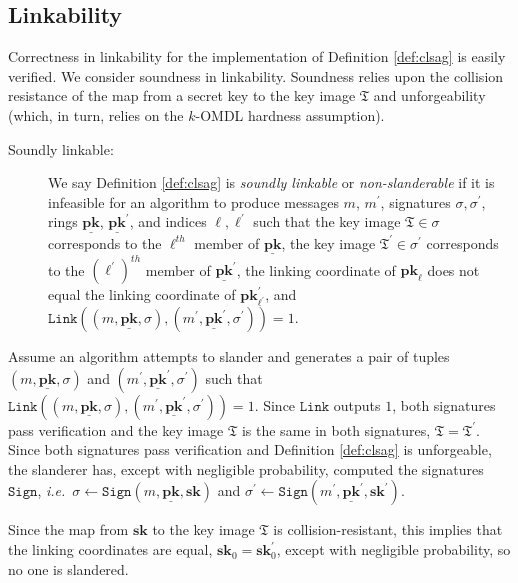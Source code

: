 \documentclass{mrl}
\theoremstyle{plain}
\theoremstyle{definition}
\begin{document}
\subsection{Linkability}
Correctness in linkability for the implementation of Definition \ref{def:clsag} is easily verified. We consider soundness in linkability. Soundness relies upon the collision resistance of the map from a secret key to the key image $\mathfrak{T}$ and unforgeability (which, in turn, relies on the $k$-OMDL hardness assumption).
\begin{description}
\item[Soundly linkable:]  We say Definition \ref{def:clsag} is \textit{soundly linkable} or \textit{non-slanderable} if it is infeasible for an algorithm to produce messages $m$, $m^\prime$, signatures $\sigma, \sigma^\prime$, rings $\underline{\textbf{pk}}$, $\underline{\textbf{pk}}^\prime$, and indices $\ell, \ell^\prime$ such that  the key image $\mathfrak{T} \in \sigma$ corresponds to the $\ell^{th}$ member of $\underline{\textbf{pk}}$, the key image $\mathfrak{T}^\prime \in \sigma^\prime$ corresponds to the $(\ell^\prime)^{th}$ member of $\underline{\textbf{pk}}^\prime$, the linking coordinate of $\textbf{pk}_\ell$ does not equal the linking coordinate of $\textbf{pk}^\prime_{\ell^\prime}$,  and $\texttt{Link}((m, \underline{\textbf{pk}}, \sigma), (m^\prime, \underline{\textbf{pk}}^\prime, \sigma^\prime))=1$.
\end{description}

Assume an algorithm attempts to slander and generates a pair of tuples $(m, \underline{\textbf{pk}}, \sigma)$ and  $(m^\prime, \underline{\textbf{pk}}^\prime, \sigma^\prime)$ such that $\texttt{Link}((m, \underline{\textbf{pk}}, \sigma), (m^\prime, \underline{\textbf{pk}}^\prime, \sigma^\prime)) = 1$. Since $\texttt{Link}$ outputs $1$, both signatures pass verification and the key image $\mathfrak{T}$ is the same in both signatures, $\mathfrak{T} = \mathfrak{T}^\prime$.  Since both signatures pass verification and Definition \ref{def:clsag} is unforgeable, the slanderer has, except with negligible probability, computed the signatures $\texttt{Sign}$, \textit{i.e.}\ $\sigma \leftarrow \texttt{Sign}(m, \underline{\textbf{pk}}, \textbf{sk})$ and $\sigma^\prime \leftarrow \texttt{Sign}(m^\prime, \underline{\textbf{pk}}^\prime, \textbf{sk}^\prime)$. 

Since the map from $\textbf{sk}$ to the key image $\mathfrak{T}$ is collision-resistant, this implies that the linking coordinates are equal, $\textbf{sk}_0 = \textbf{sk}^\prime_0$, except with negligible probability, so no one is slandered.
\end{document}
